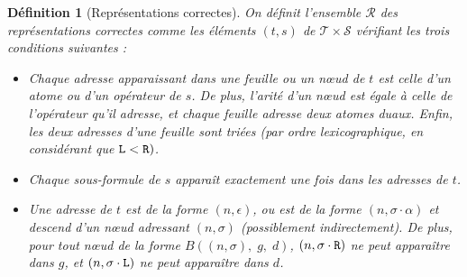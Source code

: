 \documentclass[11pt,a4paper]{article}
\newtheorem{definition}{Définition}
\newcommand*{\Left}{\textnormal{\texttt{L}}}
\newcommand*{\Right}{\textnormal{\texttt{R}}}
\newcommand*{\sequents}{\ensuremath{\mathcal{S}}}
\newcommand*{\trees}{\ensuremath{\mathcal{T}}}
\newcommand*{\representationslarge}{\ensuremath{\trees \times \sequents}}
\newcommand*{\representations}{\ensuremath{\mathcal{R}}}
\begin{document}
\begin{definition}[Représentations correctes]
    \label{def_rep}
    On définit l'ensemble \representations{} des représentations correctes comme les éléments $(t, s)$ de $\representationslarge$ vérifiant les trois conditions suivantes :
    
    \begin{itemize}
    \item[(i) Bon adressage :]{ Chaque adresse apparaissant dans une feuille ou un n\oe ud de $t$ est celle d'un atome ou d'un opérateur de $s$. De plus, l'arité d'un n\oe ud est égale à celle de l'opérateur qu'il adresse, et chaque feuille adresse deux atomes duaux. Enfin, les deux adresses d'une feuille sont triées (par ordre lexicographique, en considérant que $\Left < \Right)$.}
    
    \item[(ii) Linéarité :]{ Chaque sous-formule de $s$ apparaît exactement une fois dans les adresses de $t$.}

    \item[(iii) Descendance :]{ Une adresse de $t$ est de la forme $(n, \epsilon)$, ou est de la forme $(n, \sigma \cdot \alpha)$ et descend d'un n\oe ud adressant $(n, \sigma)$ (possiblement indirectement). De plus, pour tout n\oe ud de la forme $B((n, \sigma), \; g, \; d)$, $(n, \sigma \cdot \Right)$ ne peut apparaître dans $g$, et $(n, \sigma \cdot \Left)$ ne peut apparaître dans $d$.}
    \end{itemize}
\end{definition}
\end{document}

